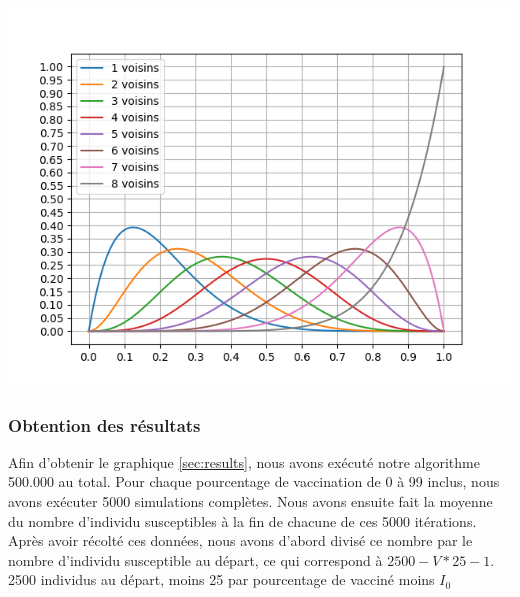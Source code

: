 \documentclass[10pt]{article}
\begin{document}
\includegraphics[scale=0.6]{probNeighbour.png}

\subsubsection{Obtention des résultats}
Afin d'obtenir le graphique \ref{sec:results}, nous avons exécuté notre algorithme 500.000 au total. Pour chaque pourcentage de vaccination de 0 à 99 inclus, nous avons exécuter 5000 simulations complètes. Nous avons ensuite fait la moyenne du nombre d'individu susceptibles à la fin de chacune de ces 5000 itérations.
Après avoir récolté ces données, nous avons d'abord divisé ce nombre par le nombre d'individu susceptible au départ, ce qui correspond à $2500-V*25-1$. 2500 individus au départ, moins 25 par pourcentage de vacciné moins $I_0$
\end{document}
